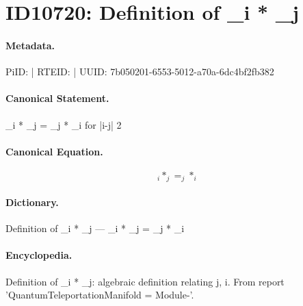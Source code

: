 \section*{ID10720: Definition of \_i * \_j}
\paragraph{Metadata.}
PiID:  | RTEID:  | UUID: 7b050201-6553-5012-a70a-6dc4bf2fb382

\paragraph{Canonical Statement.}
\_i * \_j = \_j * \_i for |i-j| 2

\paragraph{Canonical Equation.}
\[
_i * _j = _j * _i
\]

\paragraph{Dictionary.}
Definition of \_i * \_j — \_i * \_j = \_j * \_i

\paragraph{Encyclopedia.}
Definition of \_i * \_j: algebraic definition relating j, i. From report 'QuantumTeleportationManifold = Module-'.
